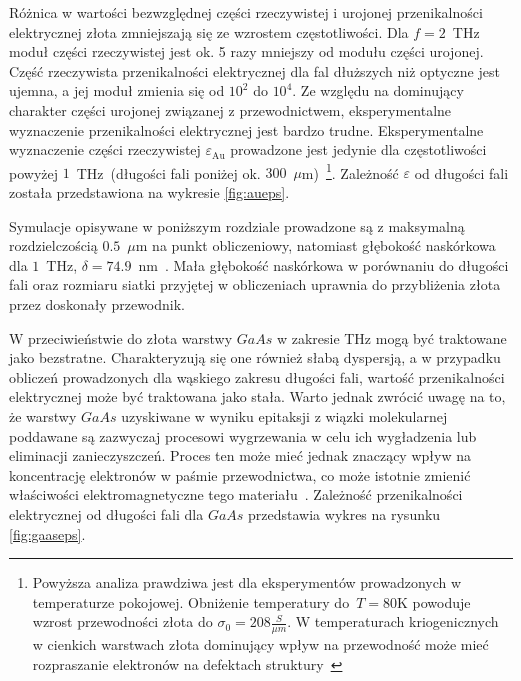 Różnica w wartości bezwzględnej części rzeczywistej i urojonej przenikalności elektrycznej złota zmniejszają się ze wzrostem częstotliwości. Dla $f=2$~THz moduł części rzeczywistej jest ok. 5 razy mniejszy od modułu części urojonej. Część rzeczywista przenikalności elektrycznej dla fal dłuższych niż optyczne jest ujemna, a jej moduł zmienia się od $10^2$ do $10^4$. Ze względu na dominujący charakter części urojonej związanej z przewodnictwem, eksperymentalne wyznaczenie przenikalności elektrycznej jest bardzo trudne. Eksperymentalne wyznaczenie części rzeczywistej $\varepsilon_{\textrm{Au}}$ prowadzone jest jedynie dla częstotliwości powyżej $1$~THz~(długości fali poniżej ok. $300$~$\mu$m)~\cite{ordal1983optical}\footnote{Powyższa analiza prawdziwa jest dla eksperymentów prowadzonych w temperaturze pokojowej. Obniżenie temperatury do~$T=$80K powoduje wzrost przewodności złota do $\sigma_0=208\frac{S}{\mu m}$. W temperaturach kriogenicznych w cienkich warstwach złota dominujący wpływ na przewodność może mieć rozpraszanie elektronów na defektach struktury~\cite{lide2009crc}}. Zależność $\varepsilon$ od długości fali została przedstawiona na wykresie \ref{fig:aueps}. 

Symulacje opisywane w poniższym rozdziale prowadzone są z maksymalną rozdzielczością $0.5$~$\mu$m na punkt obliczeniowy, natomiast głębokość naskórkowa dla $1$~THz, $\delta=74.9$~nm~\cite{lee2009principles}. Mała głębokość naskórkowa w porównaniu do długości fali oraz rozmiaru siatki przyjętej w obliczeniach uprawnia do przybliżenia złota przez doskonały przewodnik. 

W przeciwieństwie do złota warstwy $GaAs$ w zakresie THz mogą być traktowane jako bezstratne. Charakteryzują się one również słabą dyspersją, a w przypadku obliczeń prowadzonych dla wąskiego zakresu długości fali, wartość przenikalności elektrycznej może być traktowana jako stała. Warto jednak zwrócić uwagę na to, że warstwy $GaAs$ uzyskiwane w wyniku epitaksji z wiązki molekularnej poddawane są zazwyczaj procesowi wygrzewania w celu ich wygładzenia lub eliminacji zanieczyszczeń. Proces ten może mieć jednak znaczący wpływ na koncentrację elektronów w paśmie przewodnictwa, co może istotnie zmienić właściwości elektromagnetyczne tego materiału~\cite{zhang2009annealing}. Zależność przenikalności elektrycznej od długości fali dla $GaAs$ przedstawia wykres na rysunku \ref{fig:gaaseps}.


